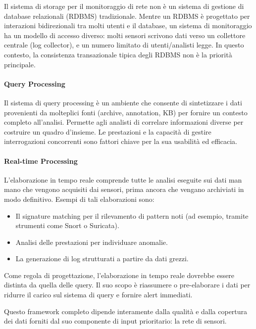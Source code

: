 Il sistema di storage per il monitoraggio di rete non è un sistema di gestione
di database relazionali (RDBMS) tradizionale.
Mentre un RDBMS è progettato per interazioni bidirezionali tra molti utenti
e il database, un sistema di monitoraggio ha un modello di accesso diverso:
molti sensori scrivono dati verso un collettore centrale (log collector),
e un numero limitato di utenti/analisti legge.
In questo contesto, la consistenza transazionale tipica degli RDBMS
non è la priorità principale.

\paragraph{Query Processing}

Il sistema di query processing è un ambiente che consente di sintetizzare
i dati provenienti da molteplici fonti (archive, annotation, KB)
per fornire un contesto completo all'analisi.
Permette agli analisti di correlare informazioni diverse per costruire
un quadro d'insieme.
Le prestazioni e la capacità di gestire interrogazioni concorrenti
sono fattori chiave per la sua usabilità ed efficacia.

\paragraph{Real-time Processing}

L'elaborazione in tempo reale comprende tutte le analisi eseguite sui dati
man mano che vengono acquisiti dai sensori, prima ancora che vengano
archiviati in modo definitivo. Esempi di tali elaborazioni sono:

\begin{itemize}
\item Il signature matching per il rilevamento di pattern noti
(ad esempio, tramite strumenti come Snort o Suricata).
\item Analisi delle prestazioni per individuare anomalie.
\item La generazione di log strutturati a partire da dati grezzi.
\end{itemize}

Come regola di progettazione, l'elaborazione in tempo reale dovrebbe essere
distinta da quella delle query. Il suo scopo è riassumere o pre-elaborare i dati
per ridurre il carico sul sistema di query e fornire alert immediati.

Questo framework completo dipende interamente dalla qualità e dalla copertura
dei dati forniti dal suo componente di input prioritario: la rete di sensori.

